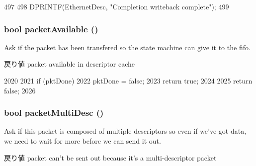 \begin{DoxyCode}
497                             {
498             DPRINTF(EthernetDesc, "Completion writeback complete\n");
499         }
\end{DoxyCode}
\hypertarget{classIGbE_1_1TxDescCache_a3fd3cdfc66306ff22b53325aeb4e2c64}{
\subsubsection[{packetAvailable}]{\setlength{\rightskip}{0pt plus 5cm}bool packetAvailable ()}}
\label{classIGbE_1_1TxDescCache_a3fd3cdfc66306ff22b53325aeb4e2c64}
Ask if the packet has been transfered so the state machine can give it to the fifo. \begin{DoxyReturn}{戻り値}
packet available in descriptor cache 
\end{DoxyReturn}



\begin{DoxyCode}
2020 {
2021     if (pktDone) {
2022         pktDone = false;
2023         return true;
2024     }
2025     return false;
2026 }
\end{DoxyCode}
\hypertarget{classIGbE_1_1TxDescCache_a126e4d9db081d9783bdcf86befdff3de}{
\subsubsection[{packetMultiDesc}]{\setlength{\rightskip}{0pt plus 5cm}bool packetMultiDesc ()}}
\label{classIGbE_1_1TxDescCache_a126e4d9db081d9783bdcf86befdff3de}
Ask if this packet is composed of multiple descriptors so even if we've got data, we need to wait for more before we can send it out. \begin{DoxyReturn}{戻り値}
packet can't be sent out because it's a multi-\/descriptor packet 
\end{DoxyReturn}



